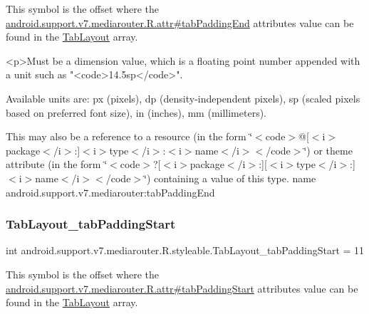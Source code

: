 This symbol is the offset where the \hyperlink{classandroid_1_1support_1_1v7_1_1mediarouter_1_1R_1_1attr_af11cb22ecb52dbd2b662fba62abac03a}{android.\+support.\+v7.\+mediarouter.\+R.\+attr\#tab\+Padding\+End} attribute\textquotesingle{}s value can be found in the \hyperlink{classandroid_1_1support_1_1v7_1_1mediarouter_1_1R_1_1styleable_a94de1350e0a902b4a974d775f2f4f25e}{Tab\+Layout} array.

\begin{DoxyVerb}      <p>Must be a dimension value, which is a floating point number appended with a unit such as "<code>14.5sp</code>".
\end{DoxyVerb}
 Available units are\+: px (pixels), dp (density-\/independent pixels), sp (scaled pixels based on preferred font size), in (inches), mm (millimeters). 

This may also be a reference to a resource (in the form \char`\"{}$<$code$>$@\mbox{[}$<$i$>$package$<$/i$>$\+:\mbox{]}$<$i$>$type$<$/i$>$\+:$<$i$>$name$<$/i$>$$<$/code$>$\char`\"{}) or theme attribute (in the form \char`\"{}$<$code$>$?\mbox{[}$<$i$>$package$<$/i$>$\+:\mbox{]}\mbox{[}$<$i$>$type$<$/i$>$\+:\mbox{]}$<$i$>$name$<$/i$>$$<$/code$>$\char`\"{}) containing a value of this type.  name android.\+support.\+v7.\+mediarouter\+:tab\+Padding\+End \mbox{\label{classandroid_1_1support_1_1v7_1_1mediarouter_1_1R_1_1styleable_a28354c7081791e6f352bb7b9963d4115}} 
\subsubsection{\texorpdfstring{Tab\+Layout\+\_\+tab\+Padding\+Start}{TabLayout\_tabPaddingStart}}
{\footnotesize\ttfamily int android.\+support.\+v7.\+mediarouter.\+R.\+styleable.\+Tab\+Layout\+\_\+tab\+Padding\+Start = 11\hspace{0.3cm}{\ttfamily [static]}}

This symbol is the offset where the \hyperlink{classandroid_1_1support_1_1v7_1_1mediarouter_1_1R_1_1attr_a46e385e70f6d519145f8f6c01da91116}{android.\+support.\+v7.\+mediarouter.\+R.\+attr\#tab\+Padding\+Start} attribute\textquotesingle{}s value can be found in the \hyperlink{classandroid_1_1support_1_1v7_1_1mediarouter_1_1R_1_1styleable_a94de1350e0a902b4a974d775f2f4f25e}{Tab\+Layout} array.

